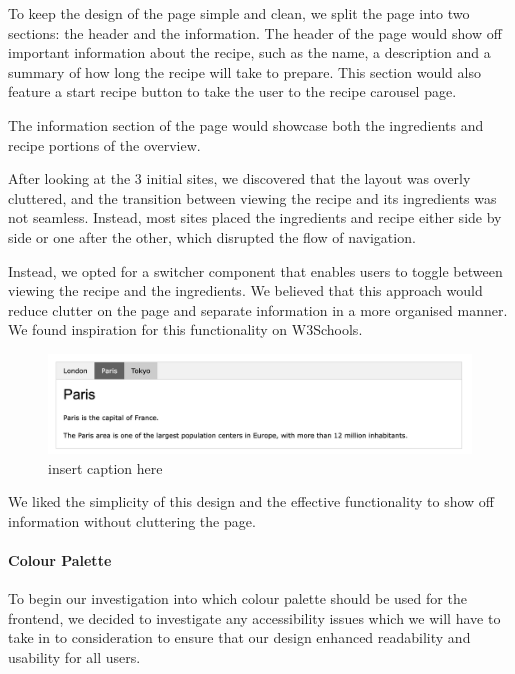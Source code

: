 \documentclass{article}
\begin{document}
    To keep the design of the page simple and clean, we split the page into two sections: the header and the information. The header of the page would show off important information about the recipe, such as the name, a description and a summary of how long the recipe will take to prepare. This section would also feature a start recipe button to take the user to the recipe carousel page.
    
    The information section of the page would showcase both the ingredients and recipe portions of the overview.
    
    After looking at the 3 initial sites, we discovered that the layout was overly cluttered, and the transition between viewing the recipe and its ingredients was not seamless. Instead, most sites placed the ingredients and recipe either side by side or one after the other, which disrupted the flow of navigation.
    
    Instead, we opted for a switcher component that enables users to toggle between viewing the recipe and the ingredients. We believed that this approach would reduce clutter on the page and separate information in a more organised manner. We found inspiration for this functionality on W3Schools.
    
    \begin{figure}[htbp]
      \includegraphics[width=1.0\textwidth]{W3Schools tabbed component.png}
      \centering
      \caption{insert caption here}
    \end{figure}

    We liked the simplicity of this design and the effective functionality to show off information without cluttering the page. 

    \paragraph{Colour Palette}
    To begin our investigation into which colour palette should be used for the frontend, we decided to investigate any accessibility issues which we will have to take in to consideration to ensure that our design enhanced readability and usability for all users. 
\end{document}
